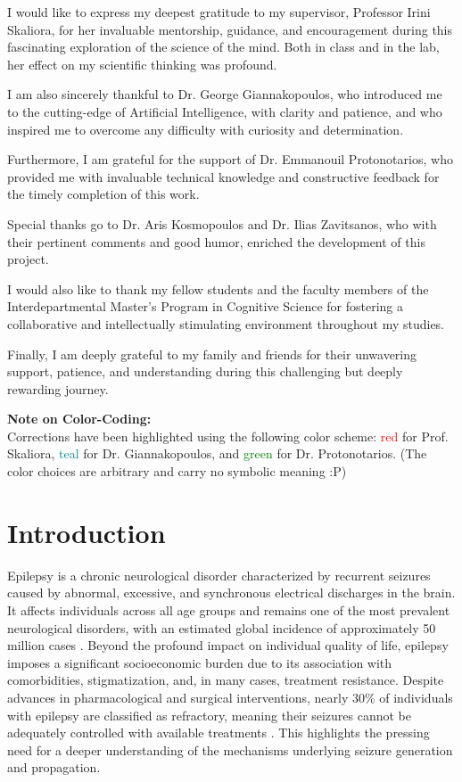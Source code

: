 \documentclass{article}
\begin{document}
I would like to express my deepest gratitude to my supervisor, Professor Irini Skaliora, for her invaluable mentorship, guidance, and encouragement during this fascinating exploration of the science of the mind. Both in class and in the lab, her effect on my scientific thinking was profound.

I am also sincerely thankful to Dr. George Giannakopoulos, who introduced me to the cutting-edge of Artificial Intelligence, with clarity and patience, and who inspired me to overcome any difficulty with curiosity and determination. 

Furthermore, I am grateful for the support of Dr. Emmanouil Protonotarios, who provided me with invaluable technical knowledge and constructive feedback for the timely completion of this work.

Special thanks go to Dr. Aris Kosmopoulos and Dr. Ilias Zavitsanos, who with their pertinent comments and good humor, enriched the development of this project.

I would also like to thank my fellow students and the faculty members of the Interdepartmental Master's Program in Cognitive Science for fostering a collaborative and intellectually stimulating environment throughout my studies.

Finally, I am deeply grateful to my family and friends for their unwavering support, patience, and understanding during this challenging but deeply rewarding journey.

\newpage

\noindent\textbf{Note on Color-Coding:} \\
Corrections have been highlighted using the following color scheme: 
\textcolor{red}{red} for Prof. Skaliora, 
\textcolor{teal}{teal} for Dr. Giannakopoulos, and 
\textcolor{green}{green} for Dr. Protonotarios. 
(The color choices are arbitrary and carry no symbolic meaning :P)

\section{Introduction}
Epilepsy is a chronic neurological disorder characterized by recurrent seizures caused by abnormal, excessive, and synchronous electrical discharges in the brain. It affects individuals across all age groups and remains one of the most prevalent neurological disorders, with an estimated global incidence of approximately 50 million cases \cite{who2019}. Beyond the profound impact on individual quality of life, epilepsy imposes a significant socioeconomic burden due to its association with comorbidities, stigmatization, and, in many cases, treatment resistance. Despite advances in pharmacological and surgical interventions, nearly 30\% of individuals with epilepsy are classified as refractory, meaning their seizures cannot be adequately controlled with available treatments \cite{janson2020}. This highlights the pressing need for a deeper understanding of the mechanisms underlying seizure generation and propagation.
\end{document}
